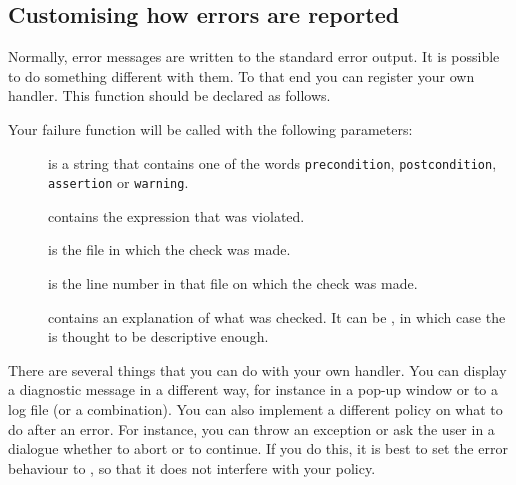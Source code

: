 \begin{ccAdvanced}

\section{Customising how errors are reported}

Normally, error messages are written to the standard error output.
It is possible to do something different with them.
To that end you can register your own handler.
This function should be declared as follows.

\ccTexHtml{\begin{samepage}}{}
\renewcommand{\ccLongParamLayout}{\ccTrue}

\lcTex{\ccAutoIndexingOff}
\ccTexHtml{\end{samepage}}{}
\lcTex{\ccAutoIndexingOn}

Your failure function will be called with the following parameters:
\begin{description}
 \item[] is a string that contains one of the words 
      \texttt{precondition}, \texttt{postcondition}, \texttt{assertion} or 
      \texttt{warning}. 
 \item[] contains the expression that was violated.
 \item[] is the file in which the check was made.
 \item[] is the line number in that file on which the check
      was made.
 \item[] contains an explanation of what was 
      checked. It can be , in which case the 
       is thought to be descriptive enough.
\end{description}

There are several things that you can do with your own handler.
You can display a diagnostic message in a different way, for instance in 
a pop-up window or to a log file (or a combination).
You can also implement a different policy on what to do after an error.
For instance, you can throw an exception or ask the user in a dialogue 
whether to abort or to continue.
If you do this, it is best to set the error behaviour to
, so that it does not interfere with your policy.


\end{ccAdvanced}

